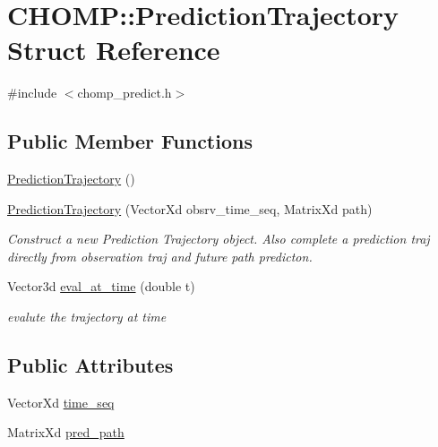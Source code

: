 \hypertarget{struct_c_h_o_m_p_1_1_prediction_trajectory}{}\section{C\+H\+O\+MP\+:\+:Prediction\+Trajectory Struct Reference}
\label{struct_c_h_o_m_p_1_1_prediction_trajectory}


{\ttfamily \#include $<$chomp\+\_\+predict.\+h$>$}

\subsection*{Public Member Functions}
\begin{DoxyCompactItemize}
\item 
\hyperlink{struct_c_h_o_m_p_1_1_prediction_trajectory_a51c4006f1e9ba69099e06b9052a14a1d}{Prediction\+Trajectory} ()
\item 
\hyperlink{struct_c_h_o_m_p_1_1_prediction_trajectory_aac8376bbb1a9b75bf87811fbcec6d062}{Prediction\+Trajectory} (Vector\+Xd obsrv\+\_\+time\+\_\+seq, Matrix\+Xd path)
\begin{DoxyCompactList}\small\item\em Construct a new Prediction Trajectory object. Also complete a prediction traj directly from observation traj and future path predicton. \end{DoxyCompactList}\item 
Vector3d \hyperlink{struct_c_h_o_m_p_1_1_prediction_trajectory_a3e50b3be07e9531449128eae47c60442}{eval\+\_\+at\+\_\+time} (double t)
\begin{DoxyCompactList}\small\item\em evalute the trajectory at time \end{DoxyCompactList}\end{DoxyCompactItemize}
\subsection*{Public Attributes}
\begin{DoxyCompactItemize}
\item 
Vector\+Xd \hyperlink{struct_c_h_o_m_p_1_1_prediction_trajectory_ae8b2997764b253ed927a7f24cea9a9fe}{time\+\_\+seq}
\item 
Matrix\+Xd \hyperlink{struct_c_h_o_m_p_1_1_prediction_trajectory_af07e1c23267f79f9e7ec029bcbb246b8}{pred\+\_\+path}
\end{DoxyCompactItemize}


